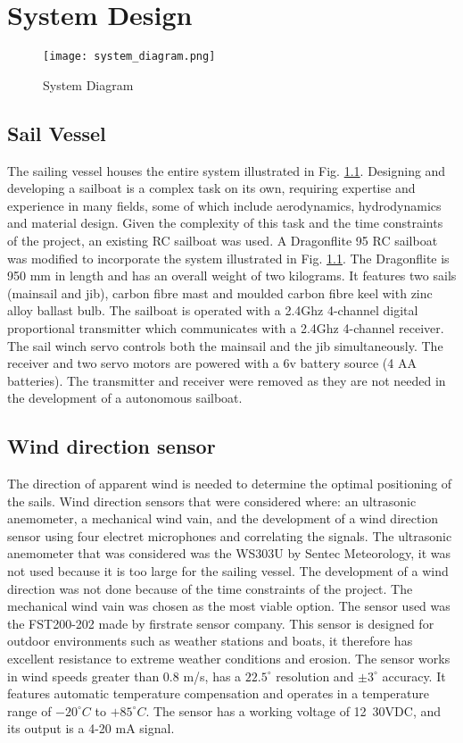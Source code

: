 \graphicspath{{system_design/fig/}}

\chapter{System Design}
\label{chap:system_design}

\begin{figure}[!h]
  \centering
  \texttt{[image: system\_diagram.png]}
  \caption[System Diagram]{System Diagram}
  \label{fig:system_diagram}
\end{figure}

\section{Sail Vessel}
The sailing vessel houses the entire system illustrated in Fig. \ref{fig:system_diagram}. Designing and developing a sailboat is a complex task on its own, 
requiring expertise and experience in many fields, some of which include aerodynamics, hydrodynamics and material design. Given the complexity of this task 
and the time constraints of the project, an existing RC sailboat was used. A Dragonflite 95 RC sailboat was modified to incorporate the system illustrated 
in Fig. \ref{fig:system_diagram}. The Dragonflite is 950 mm in length and has an overall weight of two kilograms. It features two sails (mainsail and jib), 
carbon fibre mast and moulded carbon fibre keel with zinc alloy ballast bulb. The sailboat is operated
with a 2.4Ghz 4-channel digital proportional transmitter which communicates with a 2.4Ghz 4-channel receiver. The sail winch servo controls both the mainsail 
and the jib simultaneously. The receiver and two servo motors are powered with a 6v battery source (4 AA batteries). The transmitter and receiver were 
removed as they are not needed in the development of a autonomous sailboat.

\section{Wind direction sensor}
The direction of apparent wind is needed to determine the optimal positioning of the sails. Wind direction sensors that were considered where: an ultrasonic 
anemometer, a mechanical wind vain, and the development of a wind direction sensor using four electret microphones and correlating the signals. The ultrasonic
anemometer that was considered was the WS303U by Sentec Meteorology, it was not used because it is too large for the sailing vessel. The development of a 
wind direction was not done because of the time constraints of the project. The mechanical wind vain was chosen as the most viable option. The sensor used was 
the FST200-202 made by firstrate sensor company. This sensor is designed for outdoor environments such as weather stations and boats, it therefore has 
excellent resistance to extreme weather conditions and erosion. The sensor works in wind speeds greater than 0.8 m/s, has a $22.5^{\circ}$ resolution and 
$\pm 3^{\circ}$ accuracy. It features automatic temperature compensation and operates in a temperature range of $-20^{\circ}C$ to $+85^{\circ}C$. The 
sensor has a working voltage of 12~30VDC, and its output is a 4-20 mA signal. 

